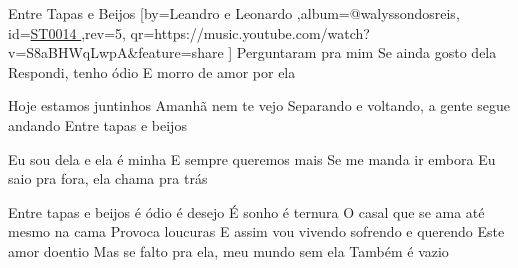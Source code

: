 \beginsong
{Entre Tapas e Beijos %
}[by={Leandro e Leonardo %
},album={@walyssondosreis},
id={\href{https://music.youtube.com/watch?v=S8aBHWqLwpA&feature=share %
}{ST0014 %
}},rev={5}, %
qr={https://music.youtube.com/watch?v=S8aBHWqLwpA&feature=share %
}]
\beginverse
Perguntaram pra mim
Se ainda gosto dela
Respondi, tenho ódio
E morro de amor por ela
\endverse

\beginverse
Hoje estamos juntinhos
Amanhã nem te vejo
Separando e voltando, a gente segue andando
Entre tapas e beijos
\endverse

\beginverse
Eu sou dela e ela é minha
E sempre queremos mais
Se me manda ir embora
Eu saio pra fora, ela chama pra trás
\endverse

\beginchorus
Entre tapas e beijos é ódio é desejo
É sonho é ternura
O casal que se ama até mesmo na cama
Provoca loucuras
E assim vou vivendo sofrendo e querendo
Este amor doentio
Mas se falto pra ela, meu mundo sem ela
Também é vazio
\endchorus
{}


